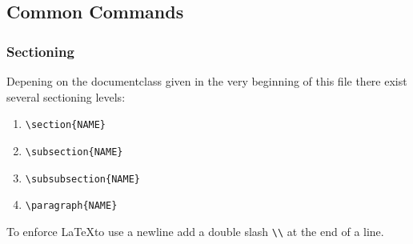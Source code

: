 \documentclass[10pt,a4paper]{scrartcl}
\begin{document}
\subsection{Common Commands}
\subsubsection{Sectioning}
Depening on the documentclass given in the very beginning of this file there
exist several sectioning levels:
\begin{enumerate}
	\item{} \verb$\section{NAME}$
	\item{} \verb$\subsection{NAME}$
	\item{} \verb$\subsubsection{NAME}$
	\item{} \verb$\paragraph{NAME}$
\end{enumerate}

\noindent To enforce \LaTeX to use a newline add a double slash \verb$\\$ at 
the end of a line.
\end{document}
